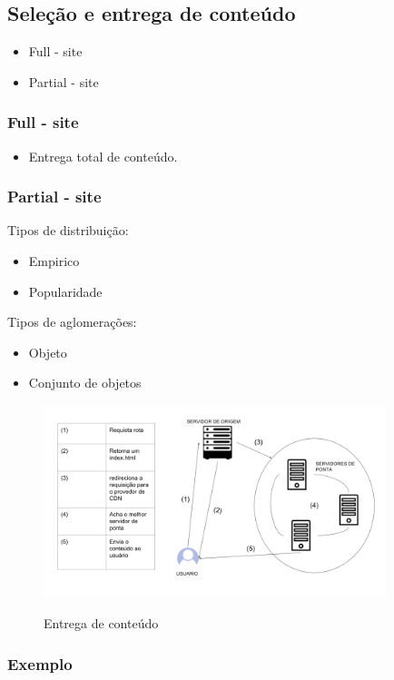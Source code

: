 \subsection{Sele\c{c}\~ao e entrega de conte\'udo}
\begin{itemize}
	\item Full - site
	\item Partial - site
\end{itemize}

\subsubsection{Full - site}
\begin{itemize}
	\item Entrega total de conte\'udo.
\end{itemize}

\subsubsection{Partial - site}

Tipos de distribui\c{c}\~ao:
\begin{itemize}
	\item Empirico
	\item Popularidade
\end{itemize}
Tipos de aglomera\c{c}\~oes:
\begin{itemize}
	\item Objeto
	\item Conjunto de objetos
\end{itemize}

\begin{figure}[h]
\caption{Entrega de conte\'udo}
\includegraphics[width=10cm]{Figuras/entrega_conteudo.png} 
\label{figura:entrega_conteudo}
\end{figure}

\subsubsection{Exemplo}

